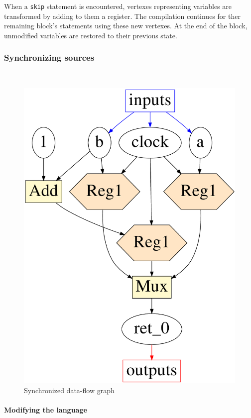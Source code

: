 \documentclass[10pt,a4paper]{article}
\renewcommand{\indent}{~\\\vspace{-.8cm}}
\newcommand{\pindent}{~\\\indent}
\newcommand{\whileyLine}{\lstinline[language=Whiley,basicstyle=\normalsize\ttfamily]}
\begin{document}
When a \whileyLine{skip} statement is encountered, vertexes representing variables are transformed by adding to them a register. The compilation continues for ther remaining block's statements using these new vertexes. At the end of the block, unmodified variables are restored to their previous state.


\subsubsection{Synchronizing sources}
\indent

\begin{figure}
	\vspace{-39pt}
	\includegraphics[scale=.23]{Reg_B.png}
	\caption{Synchronized data-flow graph}
\end{figure}

\paragraph{Modifying the language}\pindent
\end{document}
